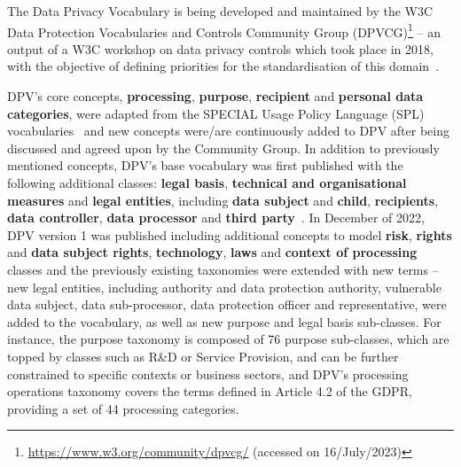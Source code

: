 The Data Privacy Vocabulary is being developed and maintained by the W3C Data Protection Vocabularies and Controls Community Group (DPVCG)\footnote{\url{https://www.w3.org/community/dpvcg/} (accessed on 16/July/2023)} -- an output of a W3C workshop on data privacy controls which took place in 2018, with the objective of defining priorities for the standardisation of this domain~\citep{bonatti_data_2018}.

DPV's core concepts, \textbf{processing}, \textbf{purpose}, \textbf{recipient} and \textbf{personal data categories}, were adapted from the SPECIAL Usage Policy Language (SPL) vocabularies~\citep{bonatti_policy_2018} and new concepts were/are continuously added to DPV after being discussed and agreed upon by the Community Group.
In addition to previously mentioned concepts, DPV's base vocabulary was first published with the following additional classes: \textbf{legal basis}, \textbf{technical and organisational measures} and \textbf{legal entities}, including \textbf{data subject} and \textbf{child}, \textbf{recipients}, \textbf{data controller}, \textbf{data processor} and \textbf{third party}~\citep{panetto_creating_2019}.
In December of 2022, DPV version 1 was published including additional concepts to model \textbf{risk}, \textbf{rights} and \textbf{data subject rights}, \textbf{technology}, \textbf{laws} and \textbf{context of processing} classes and the previously existing taxonomies were extended with new terms -- new legal entities, including authority and data protection authority, vulnerable data subject, data sub-processor, data protection officer and representative, were added to the vocabulary, as well as new purpose and legal basis sub-classes.
For instance, the purpose taxonomy is composed of 76 purpose sub-classes, which are topped by classes such as R\&D or Service Provision, and can be further constrained to specific contexts or business sectors, and DPV's processing operations taxonomy covers the terms defined in Article 4.2 of the GDPR, providing a set of 44 processing categories.

